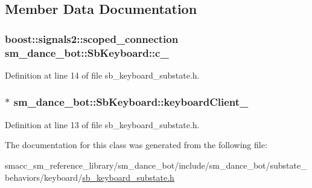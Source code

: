 \subsection{Member Data Documentation}
\subsubsection[{\texorpdfstring{c\+\_\+}{c_}}]{\setlength{\rightskip}{0pt plus 5cm}boost\+::signals2\+::scoped\+\_\+connection sm\+\_\+dance\+\_\+bot\+::\+Sb\+Keyboard\+::c\+\_\+}\hypertarget{classsm__dance__bot_1_1SbKeyboard_a9dc9a84d7fdb70453fd98e9bb49e9e21}{}\label{classsm__dance__bot_1_1SbKeyboard_a9dc9a84d7fdb70453fd98e9bb49e9e21}


Definition at line 14 of file sb\+\_\+keyboard\+\_\+substate.\+h.

\subsubsection[{\texorpdfstring{keyboard\+Client\+\_\+}{keyboardClient_}}]{$\ast$ sm\+\_\+dance\+\_\+bot\+::\+Sb\+Keyboard\+::keyboard\+Client\+\_\+}\hypertarget{classsm__dance__bot_1_1SbKeyboard_a97e5f96ff468cf7a09b46027aba5ff3d}{}\label{classsm__dance__bot_1_1SbKeyboard_a97e5f96ff468cf7a09b46027aba5ff3d}


Definition at line 13 of file sb\+\_\+keyboard\+\_\+substate.\+h.



The documentation for this class was generated from the following file\+:\begin{DoxyCompactItemize}
\item 
smacc\+\_\+sm\+\_\+reference\+\_\+library/sm\+\_\+dance\+\_\+bot/include/sm\+\_\+dance\+\_\+bot/substate\+\_\+behaviors/keyboard/\hyperlink{sb__keyboard__substate_8h}{sb\+\_\+keyboard\+\_\+substate.\+h}\end{DoxyCompactItemize}
